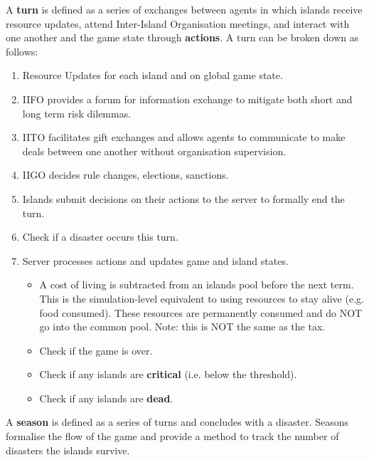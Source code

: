 \begin{definition} \label{def:turn}
    A \textbf{turn} is defined as a series of exchanges between agents in which islands receive resource updates, attend Inter-Island Organisation meetings, and interact with one another and the game state through \textbf{actions}. A turn can be broken down as follows:
    \begin{enumerate}
        \item Resource Updates for each island and on global game state.
        \item IIFO provides a forum for information exchange to mitigate both short and long term risk dilemmas.
        \item IITO facilitates gift exchanges and allows agents to communicate to make deals between one another without organisation supervision.
        \item IIGO decides rule changes, elections, sanctions.
        \item Islands submit decisions on their actions to the server to formally end the turn.
        \item Check if a disaster occurs this turn.
        \item Server processes actions and updates game and island states.
            \begin{itemize}
                \item A cost of living is subtracted from an islands pool before the next term. This is the simulation-level equivalent to using resources to stay alive (e.g. food consumed). These resources are permanently consumed and do NOT go into the common pool. Note: this is NOT the same as the tax.
                \item Check if the game is over.
                \item Check if any islands are \textbf{critical} (i.e. below the threshold).
                \item Check if any islands are \textbf{dead}.
            \end{itemize}
    \end{enumerate}        
\end{definition}

\begin{definition} \label{def:gameseason}
    A \textbf{season} is defined as a series of turns and concludes with a disaster. Seasons formalise the flow of the game and provide a method to track the number of disasters the islands survive.
\end{definition}

